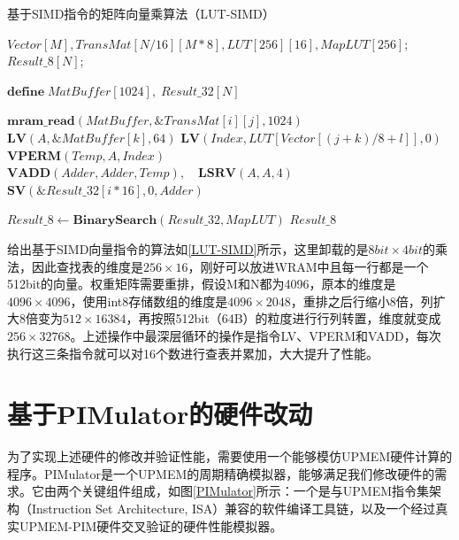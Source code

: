 \begin{algorithm}[!htbp]
    \caption{基于SIMD指令的矩阵向量乘算法（LUT-SIMD）}
    \label{LUT-SIMD}
    \begin{algorithmic}[1]
        \Require $Vector[M], TransMat[N/16][M*8], LUT[256][16], MapLUT[256]$; %
        \Ensure $Result\_8[N]$; %

        \State $\textbf{define}\;MatBuffer[1024],\;Result\_32[N]$

                \State $\textbf{mram\_read}(MatBuffer, \&TransMat[i][j], 1024)$
                    \State $\textbf{LV}(A, \&MatBuffer[k], 64)$
                        \State $\textbf{LV}(Index, LUT[Vector[(j + k) / 8 + l]], 0)$
                        \State $\textbf{VPERM}(Temp, A, Index)$
                        \State $\textbf{VADD}(Adder, Adder, Temp),\quad \textbf{LSRV}(A, A, 4)$
                    \EndFor
                \EndFor
            \EndFor
            \State $\textbf{SV}(\&Result\_32[i*16], 0, Adder)$
        \EndFor

        \State $Result\_8 \gets \textbf{BinarySearch}(Result\_32, MapLUT)$
        \Comment{\textcolor{blue}{parallel in N}}
        \State \Return $Result\_8$
    \end{algorithmic}
\end{algorithm}

给出基于SIMD向量指令的算法如\ref{LUT-SIMD}所示，这里卸载的是$8bit\times 4bit$的乘法，因此查找表的维度是$256\times 16$，刚好可以放进WRAM中且每一行都是一个512bit的向量。权重矩阵需要重排，假设M和N都为4096，原本的维度是$4096\times 4096$，使用int8存储数组的维度是$4096\times 2048$，重排之后行缩小8倍，列扩大8倍变为$512\times 16384$，再按照512bit（64B）的粒度进行行列转置，维度就变成$256\times 32768$。上述操作中最深层循环的操作是指令LV、VPERM和VADD，每次执行这三条指令就可以对16个数进行查表并累加，大大提升了性能。

\section{基于PIMulator的硬件改动}
为了实现上述硬件的修改并验证性能，需要使用一个能够模仿UPMEM硬件计算的程序。PIMulator是一个UPMEM的周期精确模拟器\cite{uPimulator}，能够满足我们修改硬件的需求。它由两个关键组件组成，如图\ref{PIMulator}所示：一个是与UPMEM指令集架构（Instruction Set Architecture, ISA）兼容的软件编译工具链，以及一个经过真实UPMEM-PIM硬件交叉验证的硬件性能模拟器。

